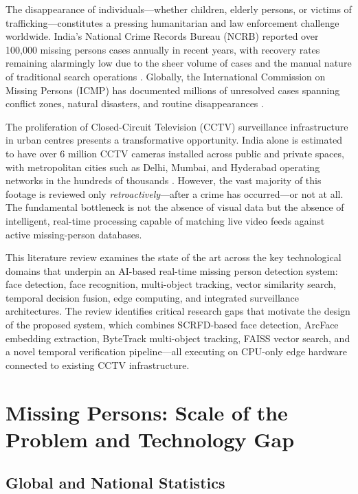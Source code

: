 \documentclass[12pt, a4paper]{article}
\begin{document}
The disappearance of individuals---whether children, elderly persons, or victims of trafficking---constitutes a pressing humanitarian and law enforcement challenge worldwide. India's National Crime Records Bureau (NCRB) reported over 100,000 missing persons cases annually in recent years, with recovery rates remaining alarmingly low due to the sheer volume of cases and the manual nature of traditional search operations \cite{ncrb2023}. Globally, the International Commission on Missing Persons (ICMP) has documented millions of unresolved cases spanning conflict zones, natural disasters, and routine disappearances \cite{icmp2022}.

The proliferation of Closed-Circuit Television (CCTV) surveillance infrastructure in urban centres presents a transformative opportunity. India alone is estimated to have over 6 million CCTV cameras installed across public and private spaces, with metropolitan cities such as Delhi, Mumbai, and Hyderabad operating networks in the hundreds of thousands \cite{comparitech2023}. However, the vast majority of this footage is reviewed only \textit{retroactively}---after a crime has occurred---or not at all. The fundamental bottleneck is not the absence of visual data but the absence of intelligent, real-time processing capable of matching live video feeds against active missing-person databases.

This literature review examines the state of the art across the key technological domains that underpin an AI-based real-time missing person detection system: face detection, face recognition, multi-object tracking, vector similarity search, temporal decision fusion, edge computing, and integrated surveillance architectures. The review identifies critical research gaps that motivate the design of the proposed system, which combines SCRFD-based face detection, ArcFace embedding extraction, ByteTrack multi-object tracking, FAISS vector search, and a novel temporal verification pipeline---all executing on CPU-only edge hardware connected to existing CCTV infrastructure.


\section{Missing Persons: Scale of the Problem and Technology Gap}

\subsection{Global and National Statistics}
\end{document}
